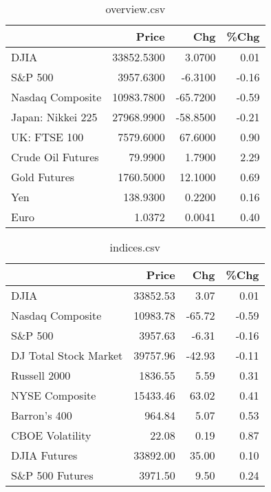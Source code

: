 \documentclass{article}%
\begin{document}
\begin{table}[htbp]%
\caption{overview.csv}%
\centering%
\begin{adjustbox}{width=1\textwidth}%
\begin{tabular}{lrrr}
\toprule
                  &      Price &      Chg &  \%Chg \\
\midrule
             DJIA & 33852.5300 &   3.0700 &  0.01 \\
          S\&P 500 &  3957.6300 &  -6.3100 & -0.16 \\
 Nasdaq Composite & 10983.7800 & -65.7200 & -0.59 \\
Japan: Nikkei 225 & 27968.9900 & -58.8500 & -0.21 \\
     UK: FTSE 100 &  7579.6000 &  67.6000 &  0.90 \\
Crude Oil Futures &    79.9900 &   1.7900 &  2.29 \\
     Gold Futures &  1760.5000 &  12.1000 &  0.69 \\
              Yen &   138.9300 &   0.2200 &  0.16 \\
             Euro &     1.0372 &   0.0041 &  0.40 \\
\bottomrule
\end{tabular}
%
\end{adjustbox}%
\end{table}

%


\begin{table}[htbp]%
\caption{indices.csv}%
\centering%
\begin{adjustbox}{width=1\textwidth}%
\begin{tabular}{lrrr}
\toprule
                      &    Price &    Chg &  \%Chg \\
\midrule
                 DJIA & 33852.53 &   3.07 &  0.01 \\
     Nasdaq Composite & 10983.78 & -65.72 & -0.59 \\
              S\&P 500 &  3957.63 &  -6.31 & -0.16 \\
DJ Total Stock Market & 39757.96 & -42.93 & -0.11 \\
         Russell 2000 &  1836.55 &   5.59 &  0.31 \\
       NYSE Composite & 15433.46 &  63.02 &  0.41 \\
         Barron's 400 &   964.84 &   5.07 &  0.53 \\
      CBOE Volatility &    22.08 &   0.19 &  0.87 \\
         DJIA Futures & 33892.00 &  35.00 &  0.10 \\
      S\&P 500 Futures &  3971.50 &   9.50 &  0.24 \\
\bottomrule
\end{tabular}
%
\end{adjustbox}%
\end{table}
\end{document}

